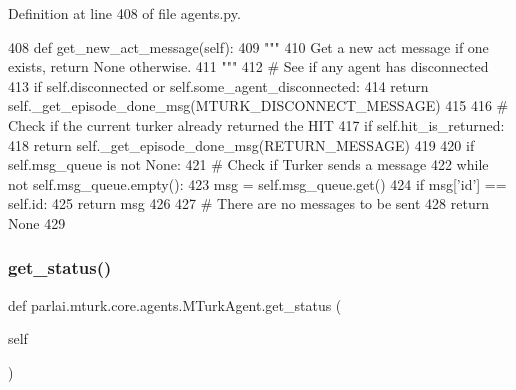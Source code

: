 Definition at line 408 of file agents.\+py.


\begin{DoxyCode}
408     \textcolor{keyword}{def }get\_new\_act\_message(self):
409         \textcolor{stringliteral}{"""}
410 \textcolor{stringliteral}{        Get a new act message if one exists, return None otherwise.}
411 \textcolor{stringliteral}{        """}
412         \textcolor{comment}{# See if any agent has disconnected}
413         \textcolor{keywordflow}{if} self.disconnected \textcolor{keywordflow}{or} self.some\_agent\_disconnected:
414             \textcolor{keywordflow}{return} self.\_get\_episode\_done\_msg(MTURK\_DISCONNECT\_MESSAGE)
415 
416         \textcolor{comment}{# Check if the current turker already returned the HIT}
417         \textcolor{keywordflow}{if} self.hit\_is\_returned:
418             \textcolor{keywordflow}{return} self.\_get\_episode\_done\_msg(RETURN\_MESSAGE)
419 
420         \textcolor{keywordflow}{if} self.msg\_queue \textcolor{keywordflow}{is} \textcolor{keywordflow}{not} \textcolor{keywordtype}{None}:
421             \textcolor{comment}{# Check if Turker sends a message}
422             \textcolor{keywordflow}{while} \textcolor{keywordflow}{not} self.msg\_queue.empty():
423                 msg = self.msg\_queue.get()
424                 \textcolor{keywordflow}{if} msg[\textcolor{stringliteral}{'id'}] == self.id:
425                     \textcolor{keywordflow}{return} msg
426 
427         \textcolor{comment}{# There are no messages to be sent}
428         \textcolor{keywordflow}{return} \textcolor{keywordtype}{None}
429 
\end{DoxyCode}
\mbox{\label{classparlai_1_1mturk_1_1core_1_1agents_1_1MTurkAgent_a0522b17872a4a9a22e2c0e5237f8ac82}} 
\subsubsection{\texorpdfstring{get\+\_\+status()}{get\_status()}}
{\footnotesize\ttfamily def parlai.\+mturk.\+core.\+agents.\+M\+Turk\+Agent.\+get\+\_\+status (\begin{DoxyParamCaption}\item[{}]{self }\end{DoxyParamCaption})}

